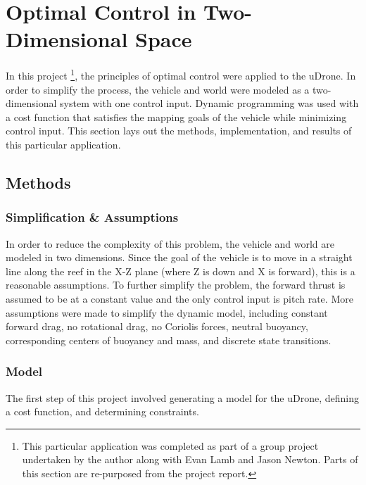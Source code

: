 \chapter{Optimal Control in Two-Dimensional Space}\label{2d}

In this project \footnote{This particular application was completed as part of a group project undertaken by the author along with Evan Lamb and Jason Newton. Parts of this section are re-purposed from the project report.}, the principles of optimal control were applied to the uDrone. In order to simplify the process, the vehicle and world were modeled as a two-dimensional system with one control input. Dynamic programming was used with a cost function that satisfies the mapping goals of the vehicle while minimizing control input. This section lays out the methods, implementation, and results of this particular application.

\section{Methods}
\subsection{Simplification \& Assumptions}
In order to reduce the complexity of this problem, the vehicle and world are modeled in two dimensions. Since the goal of the vehicle is to move in a straight line along the reef in the X-Z plane (where Z is down and X is forward), this is a reasonable assumptions. To further simplify the problem, the forward thrust is assumed to be at a constant value and the only control input is pitch rate. More assumptions were made to simplify the dynamic model, including constant forward drag, no rotational drag, no Coriolis forces, neutral buoyancy, corresponding centers of buoyancy and mass, and discrete state transitions. 

\subsection{Model}
The first step of this project involved generating a model for the uDrone, defining a cost function, and determining constraints. 

